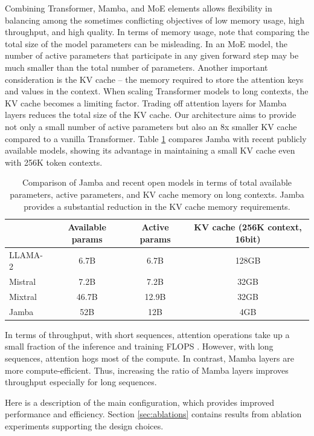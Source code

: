 \documentclass{article}
\begin{document}
Combining Transformer, Mamba, and MoE elements allows flexibility in balancing among the sometimes conflicting objectives of low memory usage, high throughput, and high quality. In terms of memory usage, note that comparing the total size of the model parameters can be misleading. In an MoE model, the number of active parameters that participate in any given forward step may be much smaller than the total number of parameters. Another important consideration is the KV cache -- the memory required to store the attention keys and values in the context. When scaling Transformer models to long contexts, the KV cache becomes a limiting factor. Trading off attention layers for Mamba layers reduces the total size of the KV cache. Our architecture aims to provide not only a small number of active parameters but also an 8x smaller KV cache compared to a vanilla Transformer. 
Table \ref{table:params-cache} compares Jamba with recent publicly available models, showing its advantage in maintaining a small KV cache even with 256K token contexts.


\begin{table}[h]
\centering
\begin{tabular}{l c c c}
    \toprule
    & Available params & Active params & KV cache (256K context, 16bit) \\ 
    \midrule     
    LLAMA-2 & 6.7B & 6.7B & 128GB \\
    Mistral & 7.2B & 7.2B & 32GB \\ 
    Mixtral & 46.7B & 12.9B & 32GB \\ 
    Jamba & 52B & 12B & 4GB \\
    \bottomrule
\end{tabular}
\vspace{1pt}
\caption{Comparison of Jamba and recent open models in terms of total available parameters, active parameters, and KV cache memory on long contexts. Jamba provides a substantial reduction in the KV cache memory requirements.}
\label{table:params-cache}
\end{table}


In terms of throughput, with short sequences, attention operations take up a small fraction of the inference and training FLOPS \cite{chowdhery2023palm}. However, with long sequences, attention hogs most of the compute. In contrast, Mamba layers are more compute-efficient. Thus, increasing the ratio of Mamba layers improves throughput especially for long sequences.  

Here is a description of the main configuration, which provides improved performance and efficiency. Section \ref{sec:ablations} contains results from ablation experiments supporting the design choices. 
\end{document}
